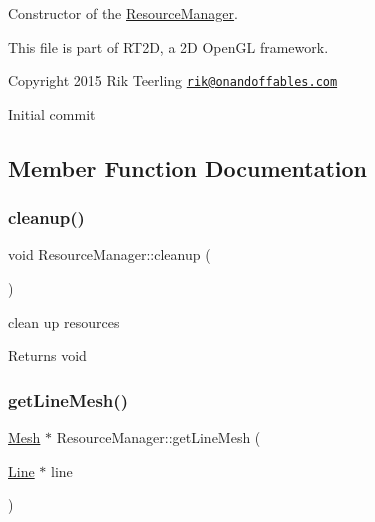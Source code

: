 Constructor of the \hyperlink{class_resource_manager}{Resource\+Manager}. 

This file is part of R\+T2D, a 2D Open\+GL framework.


\begin{DoxyItemize}
\item Copyright 2015 Rik Teerling \href{mailto:rik@onandoffables.com}{\tt rik@onandoffables.\+com}
\begin{DoxyItemize}
\item Initial commit 
\end{DoxyItemize}
\end{DoxyItemize}

\subsection{Member Function Documentation}
\mbox{\label{class_resource_manager_a027b7aa8171349b251ec46e4cc8ead56}} 
\subsubsection{\texorpdfstring{cleanup()}{cleanup()}}
{\footnotesize\ttfamily void Resource\+Manager\+::cleanup (\begin{DoxyParamCaption}{ }\end{DoxyParamCaption})}



clean up resources 

\begin{DoxyReturn}{Returns}
void 
\end{DoxyReturn}
\mbox{\label{class_resource_manager_ac6b7bc445bf9193e5791d80d74b07591}} 
\subsubsection{\texorpdfstring{get\+Line\+Mesh()}{getLineMesh()}}
{\footnotesize\ttfamily \hyperlink{class_mesh}{Mesh} $\ast$ Resource\+Manager\+::get\+Line\+Mesh (\begin{DoxyParamCaption}\item[{\hyperlink{class_line}{Line} $\ast$}]{line }\end{DoxyParamCaption})}




